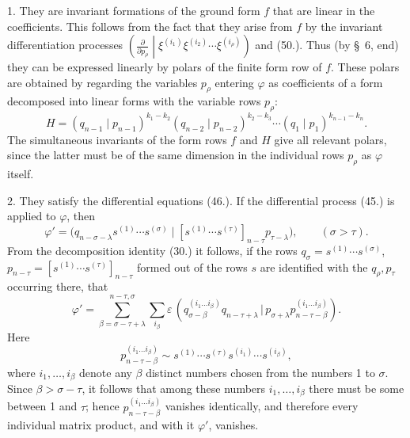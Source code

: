 \documentclass[11pt]{article}
\newcommand{\pair}[2]{(#1\,|\,#2)}
\newcommand{\eps}{\varepsilon}
\begin{document}
1. They are invariant formations of the ground form $f$ that are linear in the coefficients. This follows from the fact that they arise from $f$ by the invariant differentiation processes $\left(\frac{\partial}{\partial p_\rho}\middle|\xi^{(i_1)}\xi^{(i_2)}\cdots\xi^{(i_\rho)}\right)$ and (50.). Thus (by \S\ 6, end) they can be expressed linearly by polars of the finite form row of $f$. These polars are obtained by regarding the variables $p_\rho$ entering $\varphi$ as coefficients of a form decomposed into linear forms with the variable rows $p_\rho$:
\begin{equation}
 H=(q_{n-1}\mid p_{n-1})^{k_1-k_2}(q_{n-2}\mid p_{n-2})^{k_2-k_3}\cdots(q_1\mid p_1)^{k_{n-1}-k_n}.
\tag{52}
\end{equation}
The simultaneous invariants of the form rows $f$ and $H$ give all relevant polars, since the latter must be of the same dimension in the individual rows $p_\rho$ as $\varphi$ itself.

2. They satisfy the differential equations (46.). If the differential process (45.) is applied to $\varphi$, then
\[
 \varphi'=\bigl(q_{n-\sigma-\lambda}s^{(1)}\cdots s^{(\sigma)}\mid [s^{(1)}\cdots s^{(\tau)}]_{n-\tau}p_{\tau-\lambda}\bigr),\qquad (\sigma>\tau).
\]
From the decomposition identity (30.) it follows, if the rows $q_\sigma=s^{(1)}\cdots s^{(\sigma)}$, $p_{n-\tau}=[s^{(1)}\cdots s^{(\tau)}]_{n-\tau}$ formed out of the rows $s$ are identified with the $q_\rho,p_\tau$ occurring there, that
\[
 \varphi'=\sum_{\beta=\sigma-\tau+\lambda}^{n-\tau,\sigma}\sum_{i_\beta}\eps\,
 \pair{q_{\sigma-\beta}^{(i_1\ldots i_\beta)}q_{n-\tau+\lambda}}{p_{\sigma+\lambda}p_{n-\tau-\beta}^{(i_1\ldots i_\beta)}}.
\]
Here
\[
 p_{n-\tau-\beta}^{(i_1\ldots i_\beta)}\sim s^{(1)}\cdots s^{(\tau)}s^{(i_1)}\cdots s^{(i_\beta)},
\]
where $i_1,
\ldots,i_\beta$ denote any $\beta$ distinct numbers chosen from the numbers 1 to $\sigma$. Since $\beta>\sigma-\tau$, it follows that among these numbers $i_1,
\ldots,i_\beta$ there must be some between 1 and $\tau$; hence $p_{n-\tau-\beta}^{(i_1\ldots i_\beta)}$ vanishes identically, and therefore every individual matrix product, and with it $\varphi'$, vanishes.
\end{document}
